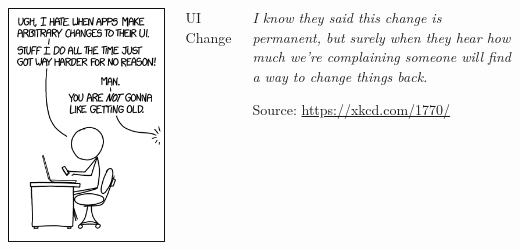 
\begin{frame}
%
\begin{columns}[T]
\begin{center}
	\includegraphics[width=.67\linewidth]{./gfx/xkcd-change}
\end{center}
%
\begin{Large}
	{UI Change}
\end{Large}
%
\begin{center}
	\vspace{60pt}
	\emph{I know they said this change is permanent, but surely when they hear how much we're complaining someone will find a way to change things back.}

	\vspace{6pt}
	Source: \url{https://xkcd.com/1770/}
\end{center}
\end{columns}

%
\end{frame}


